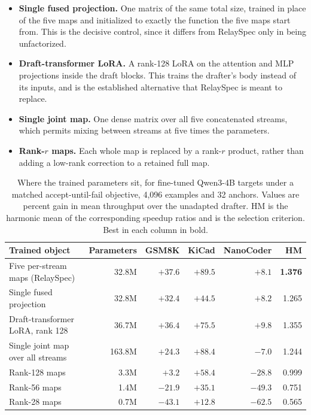 \begin{itemize}\itemsep1pt\parskip0pt
\item \textbf{Single fused projection.} One matrix of the same total size, trained in place of the five maps and initialized to exactly the function the five maps start from. This is the decisive control, since it differs from RelaySpec only in being unfactorized.
\item \textbf{Draft-transformer LoRA.} A rank-128 LoRA on the attention and MLP projections inside the draft blocks. This trains the drafter's body instead of its inputs, and is the established alternative that RelaySpec is meant to replace.
\item \textbf{Single joint map.} One dense matrix over all five concatenated streams, which permits mixing between streams at five times the parameters.
\item \textbf{Rank-$r$ maps.} Each whole map is replaced by a rank-$r$ product, rather than adding a low-rank correction to a retained full map.
\end{itemize}

\begin{table}[t]
\centering
\caption{Where the trained parameters sit, for fine-tuned Qwen3-4B targets under a matched accept-until-fail objective, 4{,}096 examples and 32 anchors. Values are percent gain in mean throughput over the unadapted drafter. HM is the harmonic mean of the corresponding speedup ratios and is the selection criterion. Best in each column in bold.}
\label{tab:ablation-placement}
\small
\begin{tabular}{lrrrrr}
\toprule
Trained object & Parameters & GSM8K & KiCad & NanoCoder & HM \\
\midrule
Five per-stream maps (RelaySpec) & 32.8M & $\mathbf{+37.6}$ & $+89.5$ & $+8.1$ & \textbf{1.376} \\
Single fused projection & 32.8M & $+32.4$ & $+44.5$ & $+8.2$ & 1.265 \\
Draft-transformer LoRA, rank 128 & 36.7M & $+36.4$ & $+75.5$ & $\mathbf{+9.8}$ & 1.355 \\
Single joint map over all streams & 163.8M & $+24.3$ & $\mathbf{+88.4}$ & $-7.0$ & 1.244 \\
Rank-128 maps & 3.3M & $+3.2$ & $+58.4$ & $-28.8$ & 0.999 \\
Rank-56 maps & 1.4M & $-21.9$ & $+35.1$ & $-49.3$ & 0.751 \\
Rank-28 maps & 0.7M & $-43.1$ & $+12.8$ & $-62.5$ & 0.565 \\
\bottomrule
\end{tabular}
\end{table}

